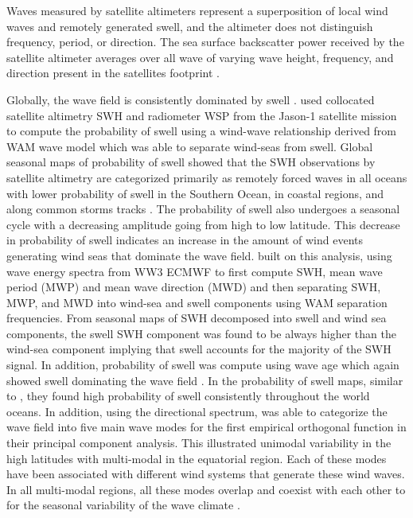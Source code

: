 \documentclass[draft,linenumbers]{agujournal2018}
\begin{document}
Waves measured by satellite altimeters represent a superposition of local wind waves and remotely generated swell, and the altimeter does not distinguish frequency, period, or direction.  The sea surface backscatter power received  by the satellite altimeter averages over all wave of varying wave height, frequency, and direction present in the satellites footprint \cite{fu2000satellite}. 


Globally, the wave field is consistently dominated by swell \cite{chen2002global,semedo2011global}. \citet{chen2002global} used collocated satellite altimetry SWH and radiometer WSP from the Jason-1 satellite mission to compute the probability of swell using a wind-wave relationship derived from WAM wave model which was able to separate wind-seas from swell. Global seasonal maps of probability of swell showed that the SWH observations by satellite altimetry are categorized primarily as remotely forced waves in all oceans with lower probability of swell in the Southern Ocean, in coastal regions, and along common storms tracks \cite{chen2002global}. The probability of swell also undergoes a seasonal cycle with a decreasing amplitude going from high to low latitude. This decrease in probability of swell indicates an increase in the amount of wind events generating wind seas that dominate the wave field. \citet{semedo2011global} built on this analysis, using wave energy spectra from WW3 ECMWF to first compute SWH, mean wave period (MWP) and mean wave direction (MWD) and then separating SWH, MWP, and MWD into wind-sea and swell components using WAM separation frequencies. From seasonal maps of SWH decomposed into swell and wind sea components, the swell SWH component was found to be always higher than the wind-sea component implying that swell accounts for the majority of the SWH signal. In addition, probability of swell was compute using wave age which again showed swell dominating the wave field \cite{semedo2011global}. In the probability of swell maps, similar to \citet{chen2002global}, they found high probability of swell consistently throughout the world oceans. In addition, using the directional spectrum, \citet{echevarria2019seasonal} was able to categorize the wave field into five main wave modes for the first empirical orthogonal function in their principal component analysis. This illustrated unimodal variability in the high latitudes with multi-modal in the equatorial region. Each of these modes have been associated with different wind systems that generate these wind waves. In all multi-modal regions, all these modes overlap and coexist with each other to for the seasonal variability of the wave climate \cite{echevarria2019seasonal}.
\end{document}
